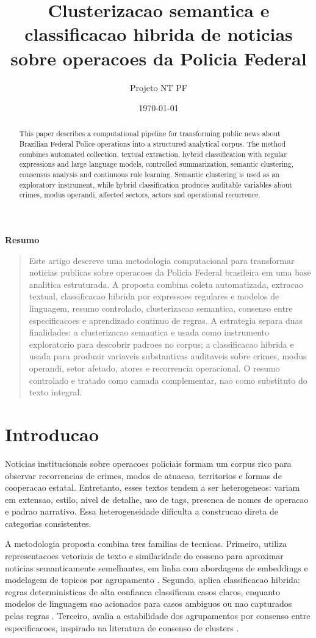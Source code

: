 \documentclass[12pt]{article}
\title{Clusterizacao semantica e classificacao hibrida de noticias sobre operacoes da Policia Federal}
\author{Projeto NT PF}
\date{\today}
\newenvironment{resumo}
{\begin{center}\textbf{Resumo}\end{center}\begin{quote}\small}
{\end{quote}}
\begin{document}
\maketitle

\begin{abstract}
This paper describes a computational pipeline for transforming public news about Brazilian Federal Police operations into a structured analytical corpus. The method combines automated collection, textual extraction, hybrid classification with regular expressions and large language models, controlled summarization, semantic clustering, consensus analysis and continuous rule learning. Semantic clustering is used as an exploratory instrument, while hybrid classification produces auditable variables about crimes, modus operandi, affected sectors, actors and operational recurrence.
\end{abstract}

\begin{resumo}
Este artigo descreve uma metodologia computacional para transformar noticias publicas sobre operacoes da Policia Federal brasileira em uma base analitica estruturada. A proposta combina coleta automatizada, extracao textual, classificacao hibrida por expressoes regulares e modelos de linguagem, resumo controlado, clusterizacao semantica, consenso entre especificacoes e aprendizado continuo de regras. A estrategia separa duas finalidades: a clusterizacao semantica e usada como instrumento exploratorio para descobrir padroes no corpus; a classificacao hibrida e usada para produzir variaveis substantivas auditaveis sobre crimes, modus operandi, setor afetado, atores e recorrencia operacional. O resumo controlado e tratado como camada complementar, nao como substituto do texto integral.
\end{resumo}

\section{Introducao}

Noticias institucionais sobre operacoes policiais formam um corpus rico para observar recorrencias de crimes, modos de atuacao, territorios e formas de cooperacao estatal. Entretanto, esses textos tendem a ser heterogeneos: variam em extensao, estilo, nivel de detalhe, uso de tags, presenca de nomes de operacao e padrao narrativo. Essa heterogeneidade dificulta a construcao direta de categorias consistentes.

A metodologia proposta combina tres familias de tecnicas. Primeiro, utiliza representacoes vetoriais de texto e similaridade do cosseno para aproximar noticias semanticamente semelhantes, em linha com abordagens de embeddings e modelagem de topicos por agrupamento \citep{reimers2019sentencebert,grootendorst2022bertopic,angelov2020top2vec}. Segundo, aplica classificacao hibrida: regras deterministicas de alta confianca classificam casos claros, enquanto modelos de linguagem sao acionados para casos ambiguos ou nao capturados pelas regras \citep{gilardi2023chatgpt,rytting2023coding,heseltine2024llm,tornberg2025llm}. Terceiro, avalia a estabilidade dos agrupamentos por consenso entre especificacoes, inspirado na literatura de consenso de clusters \citep{monti2003consensus}.
\end{document}
